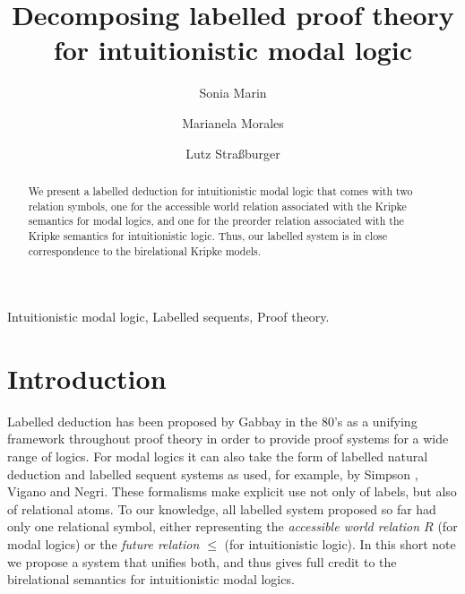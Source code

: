 \documentclass[twoside]{aiml18}
\begin{document}
\begin{frontmatter}
  \title{Decomposing labelled proof theory for intuitionistic modal logic}
  \author{Sonia Marin}
  \address{IT-Universitetet i K{\o}benhavn \\ Denmark }
 \author{Marianela Morales}
 \address{Universidad Nacional de C\'ordoba \\ Argentina}
   \author{Lutz Stra{\ss}burger}
 \address{Inria Saclay \& LIX, \'Ecole Polytechnique \\ France}

 \begin{abstract}
   We present a labelled deduction for intuitionistic modal logic that
   comes with two relation symbols, one for the accessible world
   relation associated with the Kripke semantics for modal logics, and
   one for the preorder relation associated with the Kripke semantics
   for intuitionistic logic. Thus, our labelled system is in close
   correspondence to the birelational Kripke models.


  \end{abstract}

  \begin{keyword}
  Intuitionistic modal logic, Labelled sequents, Proof theory.
  \end{keyword}
 \end{frontmatter}


\section{Introduction}

Labelled deduction has been proposed by Gabbay in the 80’s as a
unifying framework throughout proof theory in order to provide proof
systems for a wide range of logics. For modal logics it can also take
the form of labelled natural deduction and labelled sequent systems as
used, for example, by Simpson \cite{Simpson}, Vigano \cite{Vigano} and
Negri\cite{Negri}. These formalisms make explicit use not only of
labels, but also of relational atoms. To our knowledge, all labelled
system proposed so far had only one relational symbol, either
representing the \emph{accessible world relation $R$} (for modal
logics) or the \emph{future relation $\le$} (for intuitionistic
logic). In this short note we propose a system that unifies both, and
thus gives full credit to the birelational semantics for
intuitionistic modal logics.
\end{document}
